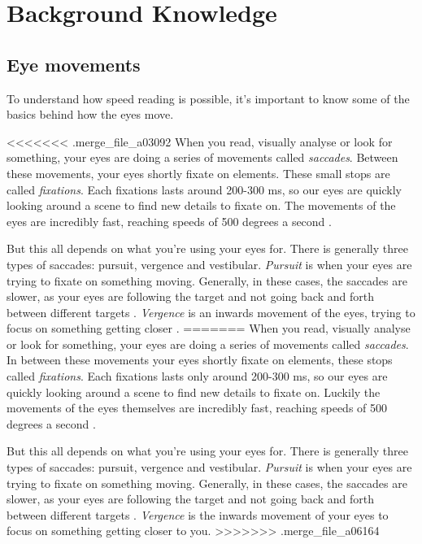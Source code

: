 \section{Background Knowledge}

\subsection{Eye movements}
To understand how speed reading is possible, it's important to know some of the basics behind how the eyes move.

<<<<<<< .merge_file_a03092
When you read, visually analyse or look for something, your eyes are doing a series of movements called \textit{saccades}. Between these movements, your eyes shortly fixate on elements. These small stops are called \textit{fixations}. Each fixations lasts around 200-300 ms, so our eyes are quickly looking around a scene to find new details to fixate on. The movements of the eyes  are incredibly fast, reaching speeds of 500 degrees a second \cite{eyeMovement}.

But this all depends on what you're using your eyes for. There is generally three types of saccades: pursuit, vergence and vestibular. \textit{Pursuit} is when your eyes are trying to fixate on something moving. Generally, in these cases, the saccades are slower, as your eyes are following the target and not going back and forth between different targets \cite{eyeMovement}.
\textit{Vergence} is an inwards movement of the eyes, trying to focus on something getting closer \cite{eyeMovement}.
=======
When you read, visually analyse or look for something, your eyes are doing a series of movements called \textit{saccades}. In between these movements your eyes shortly fixate on elements, these stops called \textit{fixations}. Each fixations lasts only around 200-300 ms, so our eyes are quickly looking around a scene to find new details to fixate on. Luckily the movements of the eyes themselves are incredibly fast, reaching speeds of 500 degrees a second \cite{eyeMovement}.


But this all depends on what you're using your eyes for. There is generally three types of saccades: pursuit, vergence and vestibular. \textit{Pursuit} is when your eyes are trying to fixate on something moving. Generally, in these cases, the saccades are slower, as your eyes are following the target and not going back and forth between different targets \cite{eyeMovement}.
\textit{Vergence} is the inwards movement of your eyes to focus on something getting closer to you.
>>>>>>> .merge_file_a06164

